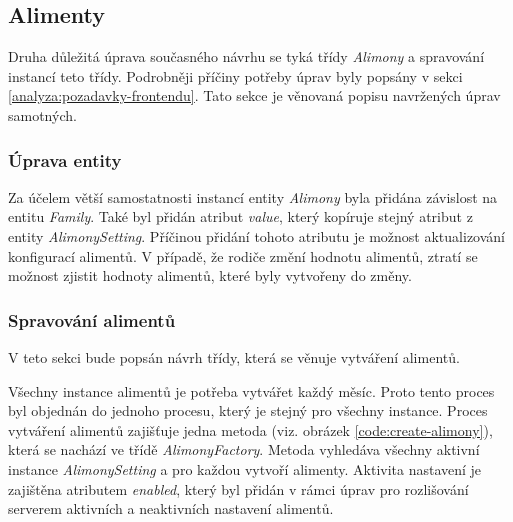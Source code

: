     \subsection{Alimenty}\label{navrh:upravy:alimenty}
        Druha důležitá úprava současného návrhu se tyká třídy \textit{Alimony} a spravování instancí teto třídy. Podrobněji příčiny potřeby úprav byly popsány v sekci \ref{analyza:pozadavky-frontendu}. Tato sekce je věnovaná popisu navržených úprav samotných.
    
        \subsubsection{Úprava entity}
            Za účelem větší samostatnosti instancí entity \textit{Alimony} byla přidána závislost na entitu \textit{Family}. Také byl přidán atribut \textit{value}, který kopíruje stejný atribut z entity \textit{AlimonySetting}. Příčinou přidání tohoto atributu je možnost aktualizování konfigurací alimentů. V případě, že rodiče změní hodnotu alimentů, ztratí se možnost zjistit hodnoty alimentů, které byly vytvořeny do změny.
        \subsubsection{Spravování alimentů}
            V teto sekci bude popsán návrh třídy, která se věnuje vytváření alimentů.
        
            Všechny instance alimentů je potřeba vytvářet každý měsíc. Proto tento proces byl objednán do jednoho procesu, který je stejný pro všechny instance. Proces vytváření alimentů zajišťuje jedna metoda (viz. obrázek \ref{code:create-alimony}), která se nachází ve třídě \textit{AlimonyFactory}. Metoda vyhledáva všechny aktivní instance \textit{AlimonySetting} a pro každou vytvoří alimenty. Aktivita nastavení je zajištěna atributem \textit{enabled}, který byl přidán v rámci úprav pro rozlišování serverem aktivních a neaktivních nastavení alimentů.
            
